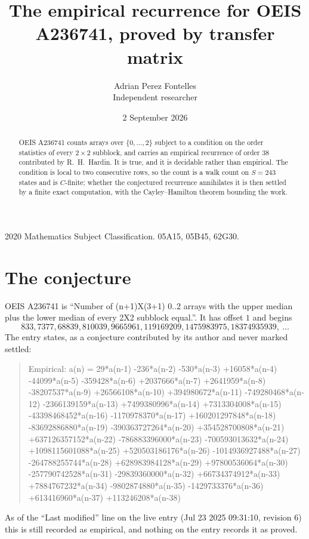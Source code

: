 \documentclass[11pt,a4paper]{article}
\title{The empirical recurrence for OEIS A236741, proved by transfer matrix}
\author{Adrian Perez Fontelles\\ \small Independent researcher}
\date{2 September 2026}
\theoremstyle{plain}
\theoremstyle{definition}
\begin{document}
\maketitle

\begin{abstract}
OEIS A236741 counts arrays over $\{0,\dots,2\}$ subject to a condition on the order
statistics of every $2\times2$ subblock, and carries an empirical recurrence of order
$38$ contributed by R.~H.~Hardin. It is true, and it is decidable rather than empirical.
The condition is local to two consecutive rows, so the count is a walk count on $S=243$
states and is $C$-finite; whether the conjectured recurrence annihilates it is then settled by
a finite exact computation, with the Cayley--Hamilton theorem bounding the work.
\end{abstract}

\noindent\small 2020 Mathematics Subject Classification. 05A15, 05B45, 62G30.\normalsize

\section{The conjecture}

OEIS A236741 is ``Number of (n+1)X(3+1) 0..2 arrays with the upper median plus the lower median of every 2X2 subblock equal.''. It has offset $1$ and begins
\[
833, 7377, 68839, 810039, 9665961, 119169209, 1475983975, 18374935939,\ \dots
\]
The entry states, as a conjecture contributed by its author and never marked settled:
\begin{quote}
Empirical: a(n) = 29*a(n-1) -236*a(n-2) -530*a(n-3) +16058*a(n-4) -44099*a(n-5) -359428*a(n-6) +2037666*a(n-7) +2641959*a(n-8) -38207537*a(n-9) +26566108*a(n-10) +394980672*a(n-11) -749280468*a(n-12) -2366139159*a(n-13) +7499380996*a(n-14) +7313304008*a(n-15) -43398468452*a(n-16) -1170978370*a(n-17) +160201297848*a(n-18) -83692886880*a(n-19) -390363727264*a(n-20) +354528700808*a(n-21) +637126357152*a(n-22) -786883396000*a(n-23) -700593013632*a(n-24) +1098115601088*a(n-25) +520503186176*a(n-26) -1014936927488*a(n-27) -264788255744*a(n-28) +628983984128*a(n-29) +97800536064*a(n-30) -257790742528*a(n-31) -29839360000*a(n-32) +66734374912*a(n-33) +7884767232*a(n-34) -9802874880*a(n-35) -1429733376*a(n-36) +613416960*a(n-37) +113246208*a(n-38)
\end{quote}
As of the ``Last modified'' line on the live entry (Jul 23 2025 09:31:10, revision 6) this is still
recorded as empirical, and nothing on the entry records it as proved.
\end{document}
